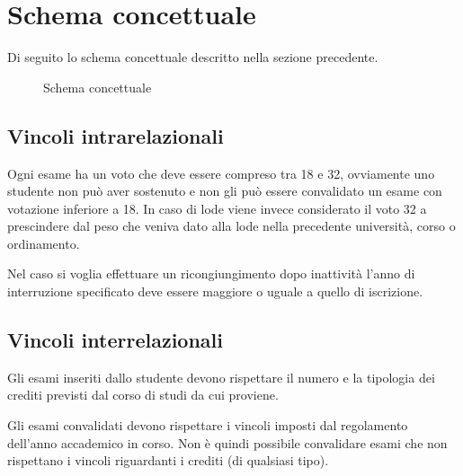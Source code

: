 \section{Schema concettuale}
Di seguito lo schema concettuale descritto nella sezione
precedente.

\begin{figure}[!ht]
	\centering
	
	\caption{Schema concettuale}
\end{figure}

\subsection{Vincoli intrarelazionali}
Ogni esame ha un voto che deve essere compreso tra 18 e 32,
ovviamente uno studente non può aver sostenuto e non gli può
essere convalidato un esame con votazione inferiore a 18. In
caso di lode viene invece considerato il voto 32 a prescindere
dal peso che veniva dato alla lode nella precedente università,
corso o ordinamento.

Nel caso si voglia effettuare un ricongiungimento dopo inattività
l'anno di interruzione specificato deve essere maggiore o uguale
a quello di iscrizione.

\subsection{Vincoli interrelazionali}
Gli esami inseriti dallo studente devono rispettare il numero
e la tipologia dei crediti previsti dal corso di studi da cui
proviene.

Gli esami convalidati devono rispettare i vincoli imposti dal
regolamento dell'anno accademico in corso. Non è quindi
possibile convalidare esami che non rispettano i vincoli
riguardanti i crediti (di qualsiasi tipo).
